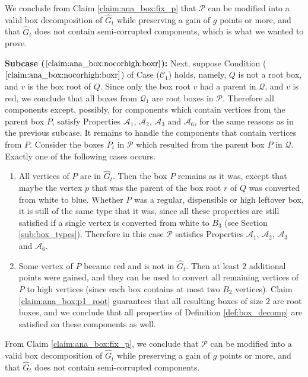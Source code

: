 \documentclass[11pt]{article}
\def\dnsitem{\vspace{-7pt}\item}
\theoremstyle{definition}
\def\decomponereg{\mathcal{A}_1}
\def\decomponecorr{\mathcal{A}_2}
\def\decomproot{\mathcal{A}_3}
\def\decompedges{\mathcal{A}_6}
\def\boxpropnocorhigh{\mathcal{C}_1}
\begin{document}
	We conclude from Claim \ref{claim:ana_box:fix_p} that $\mathcal{P}$ can be modified into a valid box decomposition of $\hat{G}_t$ while preserving a gain of $g$ points or more, and that $\hat{G}_t$ does not contain semi-corrupted components, which is what we wanted to prove.
	
\smallskip
\par\noindent
{\bf Subcase ($\ref{claim:ana_box:nocorhigh:boxr}$):}
	Next, suppose Condition ($\ref{claim:ana_box:nocorhigh:boxr}$) of Case ($\boxpropnocorhigh$) holds, namely,
	$Q$ is not a root box, and $v$ is the box root of $Q$.
	Since only the box root $v$ had a parent in $\mathcal{Q}$, and $v$ is red, we conclude that all boxes from $\mathcal{Q}_1$ are root boxes in $\mathcal{P}$.
	Therefore all components except, possibly, for components which contain vertices from the parent box $P$, 
	satisfy Properties $\decomponereg$, $\decomponecorr$, $\decomproot$ and $\decompedges$, for the same reasons as in the previous subcase.
	It remains to handle the components that contain vertices from $P$.
	Consider the boxes $P_i$ in $\mathcal{P}$ which resulted from the parent box $P$ in $\mathcal{Q}$.
	Exactly one of the following cases occurs.
	\begin{enumerate}
		\dnsitem All vertices of $P$ are in $\hat{G}_t$.
		Then the box $P$ remains as it was, except that maybe the vertex $p$ that was the parent of the box root $r$ of $Q$ was converted from white to blue.
		Whether $P$ was a regular, dispensible or high leftover box, it is still of the same type that it was, since all these properties are still satisfied if a single vertex is converted from white to $B_3$ (see Section \ref{sub:box_types}). 
		Therefore in this case $\mathcal{P}$ satisfies Properties $\decomponereg$, $\decomponecorr$, $\decomproot$ and $\decompedges$. 
		
		\dnsitem Some vertex of $P$ became red and is not in $\hat{G}_t$.
		Then at least $2$ additional points were gained, and they can be used to convert all remaining vertices of $P$ to high vertices (since each box contains at most two $B_2$ vertices).
		Claim \ref{claim:ana_box:p1_root} guarantees that all resulting boxes of size $2$ are root boxes, and we conclude that all properties of Definition \ref{def:box_decomp} are satisfied on these components as well.
	\end{enumerate}

	From Claim \ref{claim:ana_box:fix_p}, we conclude that $\mathcal{P}$ can be modified into a valid box decomposition of $\hat{G}_t$ while preserving a gain of $g$ points or more, and that $\hat{G}_t$ does not contain semi-corrupted components.
\end{document}
